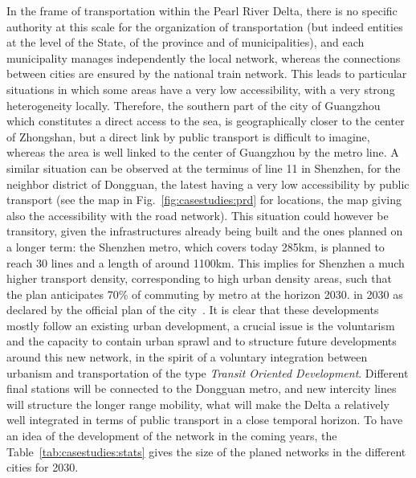 In the frame of transportation within the Pearl River Delta, there is no specific authority at this scale for the organization of transportation (but indeed entities at the level of the State, of the province and of municipalities), and each municipality manages independently the local network, whereas the connections between cities are ensured by the national train network. This leads to particular situations in which some areas have a very low accessibility, with a very strong heterogeneity locally. Therefore, the southern part of the city of Guangzhou which constitutes a direct access to the sea, is geographically closer to the center of Zhongshan, but a direct link by public transport is difficult to imagine, whereas the area is well linked to the center of Guangzhou by the metro line. A similar situation can be observed at the terminus of line 11 in Shenzhen, for the neighbor district of Dongguan, the latest having a very low accessibility by public transport (see the map in Fig.~\ref{fig:casestudies:prd} for locations, the map giving also the accessibility with the road network). This situation could however be transitory, given the infrastructures already being built and the ones planned on a longer term: the Shenzhen metro, which covers today 285km, is planned to reach 30 lines and a length of around 1100km. This implies for Shenzhen a much higher transport density, corresponding to high urban density areas, such that the plan anticipates 70\% of commuting by metro at the horizon 2030. in 2030 as declared by the official plan of the city~\cite{shenzhen2016plan}. It is clear that these developments mostly follow an existing urban development, a crucial issue is the voluntarism and the capacity to contain urban sprawl and to structure future developments around this new network, in the spirit of a voluntary integration between urbanism and transportation of the type \emph{Transit Oriented Development}. Different final stations will be connected to the Dongguan metro, and new intercity lines will structure the longer range mobility, what will make the Delta a relatively well integrated in terms of public transport in a close temporal horizon. To have an idea of the development of the network in the coming years, the Table~\ref{tab:casestudies:stats} gives the size of the planed networks in the different cities for 2030.



